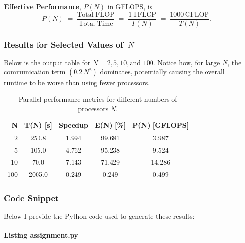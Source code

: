 \documentclass[11pt]{article}
\begin{document}
\noindent
\textbf{Effective Performance}, \(P(N)\) in GFLOPS, is
\[
P(N) 
\;=\; \frac{\text{Total FLOP}}{\text{Total Time}} 
\;=\; \frac{1\,\text{TFLOP}}{T(N)} 
\;=\; \frac{1000\,\text{GFLOP}}{T(N)}.
\]

\subsubsection*{Results for Selected Values of \(\,N\)}
Below is the output table for \(N = 2, 5, 10, \text{and } 100\). Notice how, for large \(N\), the communication term \((0.2\,N^2)\) dominates, potentially causing the overall runtime to be worse than using fewer processors.

\begin{table}[h!]
\centering
\begin{tabular}{rcccc}
\toprule
\textbf{N} & \textbf{T(N) [s]} & \textbf{Speedup} & \textbf{E(N) [\%]} & \textbf{P(N) [GFLOPS]} \\
\midrule
2   & 250.8 & 1.994 & 99.681 & 3.987 \\
5   & 105.0 & 4.762 & 95.238 & 9.524 \\
10  & 70.0  & 7.143 & 71.429 & 14.286 \\
100 & 2005.0& 0.249 & 0.249  & 0.499 \\
\bottomrule
\end{tabular}
\caption{Parallel performance metrics for different numbers of processors \(N\).}
\end{table}

\newpage
\subsubsection*{Code Snippet}
Below I provide the Python code used to generate these results:

\paragraph{Listing assignment.py}
\end{document}
